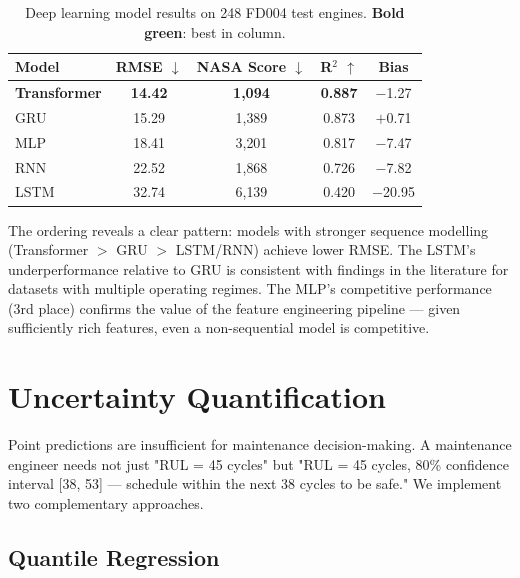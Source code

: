 \documentclass[12pt,a4paper]{report}
\begin{document}
\begin{table}[H]
\centering
\caption{Deep learning model results on 248 FD004 test engines. \textcolor{bestgreen}{\textbf{Bold green}}: best in column.}
\label{tab:dl_results}
\begin{tabular}{lcccc}
\toprule
\textbf{Model} & \textbf{RMSE} $\downarrow$ & \textbf{NASA Score} $\downarrow$ & \textbf{R$^2$} $\uparrow$ & \textbf{Bias} \\
\midrule
\textcolor{bestgreen}{\textbf{Transformer}} & \textcolor{bestgreen}{\textbf{14.42}} & \textcolor{bestgreen}{\textbf{1{,}094}} & \textcolor{bestgreen}{\textbf{0.887}} & $-$1.27 \\
GRU            & 15.29 & 1{,}389 & 0.873 & $+$0.71 \\
MLP            & 18.41 & 3{,}201 & 0.817 & $-$7.47 \\
RNN            & 22.52 & 1{,}868 & 0.726 & $-$7.82 \\
LSTM           & 32.74 & 6{,}139 & 0.420 & $-$20.95 \\
\bottomrule
\end{tabular}
\end{table}

The ordering reveals a clear pattern: models with stronger sequence modelling (Transformer $>$ GRU $>$ LSTM/RNN) achieve lower RMSE. The LSTM's underperformance relative to GRU is consistent with findings in the literature for datasets with multiple operating regimes. The MLP's competitive performance (3rd place) confirms the value of the feature engineering pipeline — given sufficiently rich features, even a non-sequential model is competitive.

\chapter{Uncertainty Quantification}
\label{chap:uncertainty}

Point predictions are insufficient for maintenance decision-making. A maintenance engineer needs not just "RUL = 45 cycles" but "RUL = 45 cycles, 80\% confidence interval [38, 53] — schedule within the next 38 cycles to be safe." We implement two complementary approaches.

\section{Quantile Regression}
\end{document}
